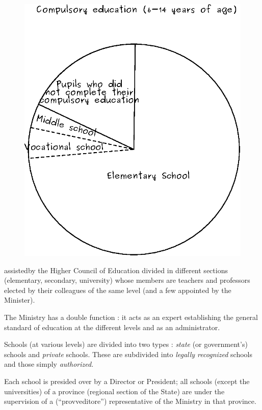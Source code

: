 \begin{figure}[H]
\centering
\includegraphics[scale=.85]{figure/fig_38a.eps}
\end{figure}


\setcounter{pageoriginal}{116}
\noindent
assisted\pageoriginale by the Higher Council of Education divided in different sections (elementary, secondary, university) whose members are teachers and professors elected by their colleagues of the same level (and a few appointed by the Minister).

The Ministry has a double function : it acts as an expert establishing the general standard of education at the different levels and as an administrator.

Schools (at various levels) are divided into two types : {\em state} (or government's) schools and {\em private} schools. These are subdivided into {\em legally recognized} schools and those simply {\em authorized.}

Each school is presided over by a Director or President; all schools (except the universities) of a province (regional section of the State) are under the supervision of a (``provveditore'') representative of the Ministry in that province.

